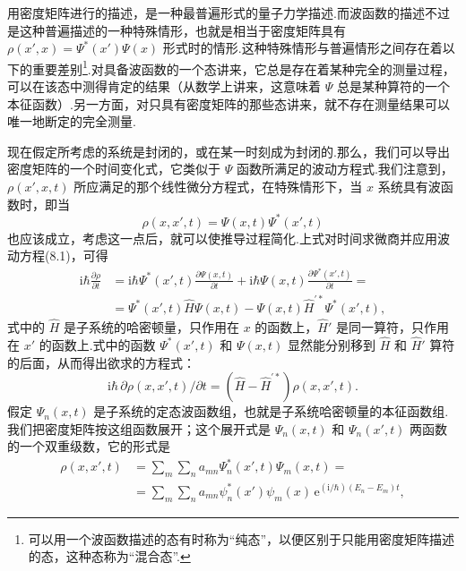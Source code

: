 用密度矩阵进行的描述，是一种最普遍形式的量子力学描述.而波函数的描述不过是这种普遍描述的一种特殊情形，也就是相当于密度矩阵具有 $\rho(x',x)=\varPsi^{*}(x')\varPsi(x)$ 形式时的情形.这种特殊情形与普遍情形之间存在着以下的重要差别\footnote{可以用一个波函数描述的态有时称为“纯态”，以便区别于只能用密度矩阵描述的态，这种态称为“混合态”.}.对具备波函数的一个态讲来，它总是存在着某种完全的测量过程，可以在该态中测得肯定的结果（从数学上讲来，这意味着 $\varPsi$ 总是某种算符的一个本征函数）.另一方面，对只具有密度矩阵的那些态讲来，就不存在测量结果可以唯一地断定的完全测量.

现在假定所考虑的系统是封闭的，或在某一时刻成为封闭的.那么，我们可以导出密度矩阵的一个时间变化式，它类似于 $\varPsi$ 函数所满足的波动方程式.我们注意到，$\rho(x',x,t)$ 所应满足的那个线性微分方程式，在特殊情形下，当 $x$ 系统具有波函数时，即当
\begin{equation*}
  \rho(x,x',t)=\varPsi(x,t)\varPsi^{*}(x',t)
\end{equation*}
也应该成立，考虑这一点后，就可以使推导过程简化.上式对时间求微商并应用波动方程(8.1)，可得
\begin{equation*}
\begin{aligned}
  \mathrm{i}\hbar\frac{\partial\rho}{\partial t}
  &=\mathrm{i}\hbar\varPsi^{*}(x',t)\frac{\partial\varPsi(x,t)}{\partial t}
  +\mathrm{i}\hbar\varPsi(x,t)\frac{\partial\varPsi^{*}(x',t)}{\partial t}=\\
  &=\varPsi^{*}(x',t)\hat{H}\varPsi(x,t)
  -\varPsi(x,t)\hat{H}^{\prime *}\varPsi^{*}(x',t),
\end{aligned}
\end{equation*}
式中的 $\hat{H}$ 是子系统的哈密顿量，只作用在 $x$ 的函数上，$\hat{H}'$ 是同一算符，只作用在 $x'$ 的函数上.式中的函数 $\varPsi^{*}(x',t)$ 和 $\varPsi(x,t)$ 显然能分别移到 $\hat{H}$ 和 $\hat{H}'$ 算符的后面，从而得出欲求的方程式：
\begin{equation}
  \mathrm{i}\hbar\,\partial\rho(x,x',t)/\partial t
  =(\hat{H}-\hat{H}^{\prime *})\rho(x,x',t).
\end{equation}
假定 $\varPsi_n(x,t)$ 是子系统的定态波函数组，也就是子系统哈密顿量的本征函数组.我们把密度矩阵按这组函数展开；这个展开式是 $\varPsi_n(x,t)$ 和 $\varPsi_n(x',t)$ 两函数的一个双重级数，它的形式是
\begin{equation}
\begin{aligned}
  \rho(x,x',t)
  &=\sum_m\sum_na_{mn}\varPsi_n^{*}(x',t)\varPsi_m(x,t)=\\
  &=\sum_m\sum_na_{mn}\psi_n^{*}(x')\psi_m(x)\,
  \mathrm{e}^{(\mathrm{i}/\hbar)(E_n-E_m)t},
\end{aligned}
\end{equation}
